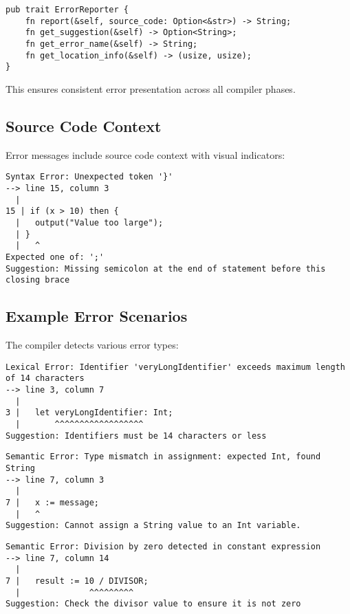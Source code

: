 \documentclass[12pt,a4paper]{article}
\begin{document}
\begin{lstlisting}[caption={Error Reporter Interface}]
pub trait ErrorReporter {
    fn report(&self, source_code: Option<&str>) -> String;
    fn get_suggestion(&self) -> Option<String>;
    fn get_error_name(&self) -> String;
    fn get_location_info(&self) -> (usize, usize);
}
\end{lstlisting}

This ensures consistent error presentation across all compiler phases.

\subsection{Source Code Context}
Error messages include source code context with visual indicators:

\begin{lstlisting}[caption={Error with Source Context}]
Syntax Error: Unexpected token '}'
--> line 15, column 3
  |
15 | if (x > 10) then {
  |   output("Value too large");
  | }
  |   ^
Expected one of: ';'
Suggestion: Missing semicolon at the end of statement before this closing brace
\end{lstlisting}

\subsection{Example Error Scenarios}
The compiler detects various error types:

\begin{lstlisting}[caption={Lexical Error Example}]
Lexical Error: Identifier 'veryLongIdentifier' exceeds maximum length of 14 characters
--> line 3, column 7
  |
3 |   let veryLongIdentifier: Int;
  |       ^^^^^^^^^^^^^^^^^^
Suggestion: Identifiers must be 14 characters or less
\end{lstlisting}

\begin{lstlisting}[caption={Semantic Error Example}]
Semantic Error: Type mismatch in assignment: expected Int, found String
--> line 7, column 3
  |
7 |   x := message;
  |   ^
Suggestion: Cannot assign a String value to an Int variable.
\end{lstlisting}

\begin{lstlisting}[caption={Compile-Time Error Example}]
Semantic Error: Division by zero detected in constant expression
--> line 7, column 14
  |
7 |   result := 10 / DIVISOR;
  |              ^^^^^^^^^
Suggestion: Check the divisor value to ensure it is not zero
\end{lstlisting}
\end{document}
